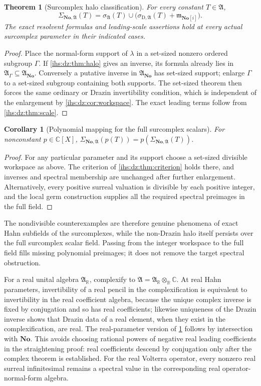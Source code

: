 \documentclass[11pt,a4paper]{article}
\numberwithin{equation}{section}
\newtheorem{theorem}{Theorem}[section]
\newtheorem{corollary}[corollary]{Corollary}
\theoremstyle{definition}
\theoremstyle{remark}
\newcommand{\C}{\mathbb C}
\newcommand{\R}{\mathbb R}
\newcommand{\No}{\mathbf{No}}
\newcommand{\Alg}{\mathfrak A}
\newcommand{\AlgG}{\mathfrak A_\Gamma}
\newcommand{\sigD}{\sigma_{\mathrm D,\Alg}}
\begin{document}
\begin{theorem}[Surcomplex halo classification]\label{ihs:dz:thm:surcomplex}
For every constant $T\in\Alg$,
\begin{equation}\label{ihs:dz:eq:surcomplex}
 \Sigma_{\No,\Alg}(T)=\sigma_\Alg(T)\cup
 \bigl(\sigD(T)+\mathfrak m_{\No[i]}\bigr).
\end{equation}
The exact resolvent formulas and leading-scale assertions hold at every
actual surcomplex parameter in their indicated cases.
\end{theorem}
\begin{proof}
Place the normal-form support of $\lambda$ in a set-sized nonzero ordered
subgroup $\Gamma$. If \cref{ihs:dz:thm:halo} gives an inverse, its formula
already lies in $\AlgG\subseteq\Alg_{\No}$. Conversely a putative inverse in
$\Alg_{\No}$ has set-sized support; enlarge $\Gamma$ to a set-sized subgroup
containing both supports. The set-sized theorem then forces the same
ordinary or Drazin invertibility condition, which is independent of the
enlargement by \cref{ihs:dz:cor:workspace}. The exact leading terms follow
from \cref{ihs:dz:thm:scale}.
\end{proof}

\begin{corollary}[Polynomial mapping for the full surcomplex scalars]\label{ihs:dz:cor:fullmapping}
For nonconstant $p\in\C[X]$,
$\Sigma_{\No,\Alg}(p(T))=p(\Sigma_{\No,\Alg}(T))$.
\end{corollary}
\begin{proof}
For any particular parameter and its support choose a set-sized divisible
workspace as above. The criterion of \cref{ihs:dz:thm:criterion} holds there,
and inverses and spectral membership are unchanged after further
enlargement. Alternatively, every positive surreal valuation is divisible by
each positive integer, and the local germ construction supplies all the
required spectral preimages in the full field.
\end{proof}

The nondivisible counterexamples are therefore genuine phenomena of exact
Hahn subfields of the surcomplexes, while the non-Drazin halo itself persists
over the full surcomplex scalar field. Passing from the integer workspace to
the full field fills missing polynomial preimages; it does not remove the
target spectral obstruction.

For a real unital algebra $\Alg_\R$, complexify to $\Alg=\Alg_\R\otimes_\R\C$.
At real Hahn parameters, invertibility of a real pencil in the
complexification is equivalent to invertibility in the real coefficient
algebra, because the unique complex inverse is fixed by conjugation and so
has real coefficients; likewise uniqueness of the Drazin inverse shows that
Drazin data of a real element, when they exist in the complexification, are
real. The real-parameter version of \cref{ihs:dz:thm:surcomplex} follows by
intersection with $\No$. This avoids choosing rational powers of negative
real leading coefficients in the straightening proof: real coefficients
descend by conjugation only after the complex theorem is established. For
the real Volterra operator, every nonzero real surreal infinitesimal remains
a spectral value in the corresponding real operator-normal-form algebra.
\end{document}
